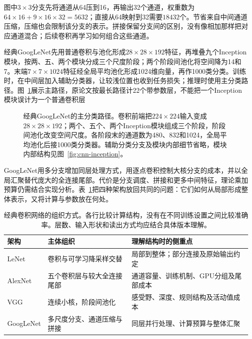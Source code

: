 图中$3\times3$分支先将通道从64压到16，再输出32个通道，权重数为$64\times16+9\times16\times32=5632$；直接从64映射到32需要$18432$个。节省来自中间通道压缩，压缩也会限制该分支的表示。拼接保留分支间的区别，没有像相加那样把对应通道混合；后续卷积再学习如何组合这些通道。

经典GoogLeNet先用普通卷积与池化形成$28\times28\times192$特征，再堆叠九个Inception模块，按两、五、两个模块分成三个尺度阶段；两个阶段间池化将空间降为14和7。末端$7\times7\times1024$特征经全局平均池化形成1024维向量，再作1000类分类。训练时，在中间层加入辅助分类器，让较浅位置也收到任务损失；推理时使用主分类路径。图~\ref{fig:cnn-googlenet}展示主路径，原论文按最长路径计22个带参数层，不能把一个Inception模块误计为一个普通卷积层

\begin{figure}[tbp]
  \centering
  
  \caption{经典GoogLeNet的主分类路径。卷积前端把$224\times224$输入变成$28\times28\times192$；两个、五个、两个Inception模块组成三个阶段，阶段间池化改变空间尺度。各阶段末的通道数为480、832和1024，全局平均池化后接1000类分类器。辅助分类分支及模块内部细节省略，模块内部结构见图~\ref{fig:cnn-inception}。}
  \label{fig:cnn-googlenet}
\end{figure}

GoogLeNet用多分支增加同层处理方式，用逐点卷积控制大核分支的成本，并以全局汇聚替代庞大的全连接尾部。代价是分支调度、拼接和更多中间特征，理论乘加预算仍需结合实现分析。表~\ref{tab:cnn-classic-architectures}把四种架构放回共同的问题：它们如何从局部形成整体表示，又将计算与参数放在何处。

\FloatBarrier

\begin{table}[htb]
  \centering
  \begin{tabularx}{\linewidth}{@{}lXX@{}}
    \toprule
    架构 & 主体组织 & 理解结构时的侧重点\\
    \midrule
    LeNet & 卷积与可学习降采样交替 & 局部到整体；部分连接及原始输出约定\\
    AlexNet & 五个卷积层与较大全连接尾部 & 通道容量、训练机制、GPU分组及尾部成本\\
    VGG & 连续小核，阶段间池化 & 感受野、深度、规则结构及活动值成本\\
    GoogLeNet & 多尺度分支、通道压缩与拼接 & 同层并行处理、计算预算与整体汇聚\\
    \bottomrule
  \end{tabularx}
  \caption{经典卷积网络的组织方式。各行比较计算结构，没有在不同训练设置之间比较准确率。层数、输入形状和读出方式均应结合具体版本理解。}
  \label{tab:cnn-classic-architectures}
\end{table}

